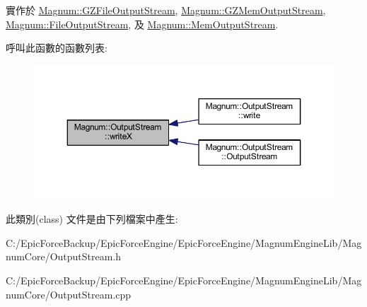 實作於 \hyperlink{class_magnum_1_1_g_z_file_output_stream_a02a08c50826c8889cbe6a04f0fedaacd}{Magnum\+::\+G\+Z\+File\+Output\+Stream}, \hyperlink{class_magnum_1_1_g_z_mem_output_stream_a0b8b2f415c3a52209e3cb3785c20246d}{Magnum\+::\+G\+Z\+Mem\+Output\+Stream}, \hyperlink{class_magnum_1_1_file_output_stream_ab3d24c893812e35318b3a535880465fb}{Magnum\+::\+File\+Output\+Stream}, 及 \hyperlink{class_magnum_1_1_mem_output_stream_ad55c8d9ab626c7813d4e462058f373e4}{Magnum\+::\+Mem\+Output\+Stream}.



呼叫此函數的函數列表\+:\nopagebreak
\begin{figure}[H]
\begin{center}
\leavevmode
\includegraphics[width=350pt]{class_magnum_1_1_output_stream_a6fee68b5bf33dab5c2674b2ff8e850be_icgraph}
\end{center}
\end{figure}




此類別(class) 文件是由下列檔案中產生\+:\begin{DoxyCompactItemize}
\item 
C\+:/\+Epic\+Force\+Backup/\+Epic\+Force\+Engine/\+Epic\+Force\+Engine/\+Magnum\+Engine\+Lib/\+Magnum\+Core/Output\+Stream.\+h\item 
C\+:/\+Epic\+Force\+Backup/\+Epic\+Force\+Engine/\+Epic\+Force\+Engine/\+Magnum\+Engine\+Lib/\+Magnum\+Core/Output\+Stream.\+cpp\end{DoxyCompactItemize}
